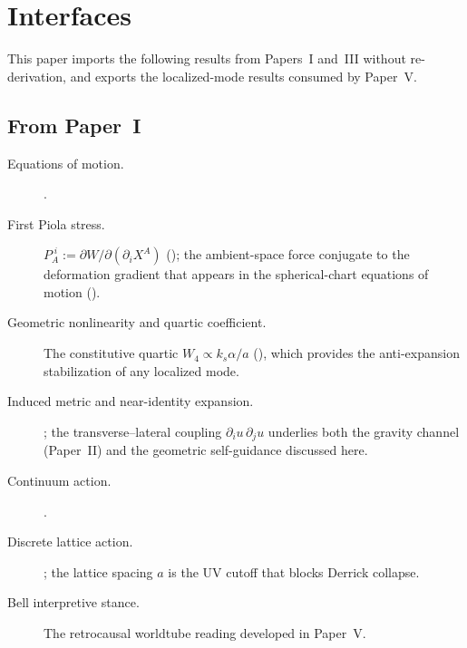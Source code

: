 \section{Interfaces}
\label{sec:interfaces}

This paper imports the following results from Papers~I and~III without re-derivation, and
exports the localized-mode results consumed by Paper~V.

\subsection*{From Paper~I}
\begin{description}
  \item[\normalfont Equations of motion.] .
  \item[\normalfont First Piola stress.] $P_A^{\;i}:=\partial W/\partial(\partial_i X^A)$
  (); the ambient-space force conjugate to the deformation gradient that
  appears in the spherical-chart equations of motion ().
  \item[\normalfont Geometric nonlinearity and quartic coefficient.]
  The constitutive quartic $W_4\propto k_s\alpha/a$ (), which provides the
  anti-expansion stabilization of any localized mode.
  \item[\normalfont Induced metric and near-identity expansion.]
  ; the transverse--lateral coupling
  $\partial_i u\,\partial_j u$ underlies both the gravity channel (Paper~II) and the
  geometric self-guidance discussed here.
  \item[\normalfont Continuum action.] .
  \item[\normalfont Discrete lattice action.] ;
  the lattice spacing $a$ is the UV cutoff that blocks Derrick collapse.
  \item[\normalfont Bell interpretive stance.] The retrocausal worldtube reading developed in Paper~V.
\end{description}

